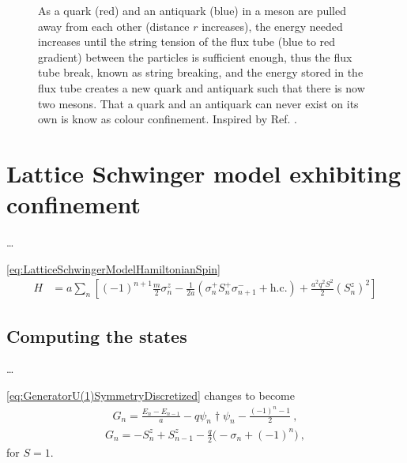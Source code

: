 \documentclass[../main.tex]{subfiles} %
\begin{document}
\begin{figure}[t]
\begin{tikzpicture}
    \end{tikzpicture}
    \caption{As a quark (red) and an antiquark (blue) in a meson are pulled away from each other (distance $r$ increases), the energy needed increases until the string tension of the flux tube (blue to red gradient) between the particles is sufficient enough, thus the flux tube break, known as string breaking, and the energy stored in the flux tube creates a new quark and antiquark such that there is now two mesons. That a quark and an antiquark can never exist on its own is know as colour confinement. Inspired by Ref. \cite{institutoDeFisicaCorpuscular_numericalApproach_2016}.}
    \label{fig:QuarkConfinement}
\end{figure}




\section{Lattice Schwinger model exhibiting confinement} \label{sec:LatticeSchwingerModelAndConfienemt}

\ldots

\cref{eq:LatticeSchwingerModelHamiltonianSpin}
\begin{align}
    H &= a \sum_n \left[ (-1)^{n+1} \frac{m}{2} \sigma_n^z - \frac{1}{2a} \left( \sigma_n^+ S_n^+ \sigma_{n+1}^- + \mathrm{h.c.} \right) + \frac{a^2 q^2 S^2}{2} \left( S_n^z \right)^2 \right]
\end{align}



\subsection{Computing the states} \label{sec:StateComputing}

\ldots

\cref{eq:GeneratorU(1)SymmetryDiscretized} changes to become
\begin{align}
    G_n = \frac{E_n - E_{n-1}}{a} - q \psi_n\dagger \psi_n - \frac{(-1)^n - 1}{2} \: ,
\end{align}
\begin{align} \label{eq:GeneratorU(1)Symmetry}
    G_n = - S_n^z + S_{n-1}^z - \frac{q}{2} \big( - \sigma_n + (-1)^n \big) \: ,
\end{align}
for $S=1$. \cite{buyens_confinementAndStringBreaking_2016}
\end{document}
